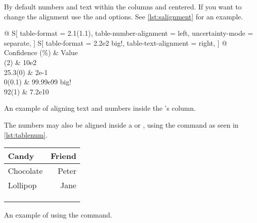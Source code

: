 By default numbers and text within the  columns and centered. If you
want to change the alignment use the  and
 options. See \autoref{lst:salignment} for an example.
\begin{listing}
  \begin{example}[examplewidth=0.7\linewidth, vertical_mode]
\begin{tabular} {
    @{}
    S[
      table-format = 2.1(1.1),
      table-number-alignment = left,
      uncertainty-mode = separate,
    ]
    S[
      table-format = 2.2e2{ big!},
      table-text-alignment = right,
    ]
    @{}
  }
  \toprule
  {Confidence (\unit{\percent})}
    & {Value} \\
  (2) & 10e2 \\
  25.3(0) & 2e-1 \\
  0(0.1)  & 99.99e99{ big!} \\
  92(1)      & 7.2e10 \\
  \bottomrule
\end{tabular}
\end{example}
  \caption{An example of aligning text and numbers inside the 's  column.}\label{lst:salignment}
\end{listing}
The numbers may also be aligned inside a  or ,
using the  command as seen in \autoref{lst:tablenum}.
\begin{listing}
  \begin{example}[examplewidth=0.7\linewidth, vertical_mode]
\begin{tabular}{@{}lr@{}}
  \toprule
  Candy     & Friend                         \\
  \midrule
  Chocolate & Peter                          \\
  Lollipop  & Jane                           \\
  \multicolumn{2}{c}{\tablenum{12,34 e0}}    \\
  \multicolumn{2}{c}{\tablenum{333.5567 e1}} \\
  \multicolumn{2}{c}{\tablenum{4563.21 e2}}  \\
  \bottomrule
\end{tabular}
\end{example}
  \caption{An example of using the  command.}\label{lst:tablenum}
\end{listing}

